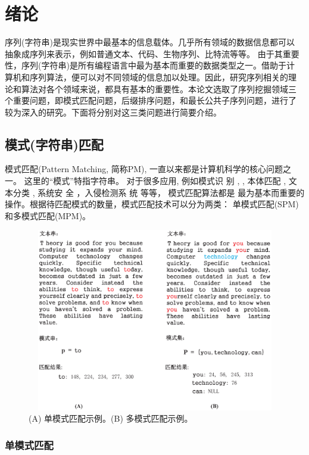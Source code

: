 \chapter{绪论}

序列(字符串)是现实世界中最基本的信息载体。几乎所有领域的数据信息都可以
抽象成序列来表示，例如普通文本、代码、生物序列、比特流等等。 由于其重要
性，序列(字符串)是所有编程语言中最为基本而重要的数据类型之一。借助于计
算机和序列算法，便可以对不同领域的信息加以处理。因此，研究序列相关的理
论和算法对各个领域来说，都具有基本的重要性。本论文选取了序列挖掘领域三
个重要问题，即模式匹配问题，后缀排序问题，和最长公共子序列问题，进行了
较为深入的研究。下面将分别对这三类问题进行简要介绍。

\section{模式(字符串)匹配}

模式匹配(Pattern Matching, 简称PM), 一直以来都是计算机科学的核心问题之
一。 这里的“模式”特指字符串。 对于很多应用, 例如模式识
别 \cite{Yan2016}, \cite{Xiao2016}, 本体匹配 \cite{Xue2015}
\cite{Xue2016}, 文本分类 \cite{Tang2015} \cite{Zhang2016}, 系统安
全 \cite{Dien2014,Malhotra2016,Fan2016}，入侵检测系
统 \cite{Kim2015,Arney2016,Sadotra2016,Lee2017} 等等， 模式匹配算法都是
最为基本而重要的操作。根据待匹配模式的数量，模式匹配技术可以分为两类：
单模式匹配(SPM)和多模式匹配(MPM)。

\begin{figure}[H]
  \centering
  \includegraphics[height=8cm ,width=12cm]{figures/1_Introduction/SPM_MPM.eps}
  \caption{(A) 单模式匹配示例。(B) 多模式匹配示例。}
  \label{fig:SPM_MPM}
\end{figure}


\subsection{单模式匹配}

